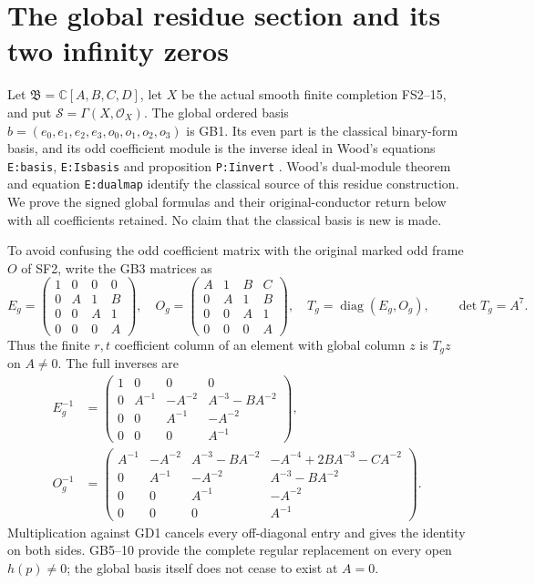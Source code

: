 \documentclass[11pt]{article}
\newcommand{\C}{\mathbb C}
\begin{document}
\section{The global residue section and its two infinity zeros}
Let $\mathfrak B=\C[A,B,C,D]$, let $X$ be the actual smooth
finite completion FS2--15, and put $\mathscr S=\Gamma(X,\mathcal O_X)$.
The global ordered basis $b=(e_0,e_1,e_2,e_3,o_0,o_1,o_2,o_3)$
is GB1. Its even part is the classical binary-form basis, and
its odd coefficient module is the inverse ideal in Wood's
equations \texttt{E:basis}, \texttt{E:Isbasis} and proposition
\texttt{P:Iinvert} \cite{WoodBinary}. Wood's dual-module theorem
and equation \texttt{E:dualmap} identify the classical source of
this residue construction. We prove the signed global formulas
and their original-conductor return below with all coefficients
retained. No claim that the classical basis is new is made.

To avoid confusing the odd coefficient matrix with the original
marked odd frame $O$ of SF2, write the GB3 matrices as
\begin{equation}
 E_g=\begin{pmatrix}1&0&0&0\\0&A&1&B\\0&0&A&1\\0&0&0&A\end{pmatrix},\quad
 O_g=\begin{pmatrix}A&1&B&C\\0&A&1&B\\0&0&A&1\\0&0&0&A\end{pmatrix},\quad
 T_g=\operatorname{diag}(E_g,O_g),\qquad\det T_g=A^7.
 \tag{GD1}
\end{equation}
Thus the finite $r,t$ coefficient column of an element with
global column $z$ is $T_gz$ on $A\ne0$. The full inverses are
\begin{equation}
\begin{aligned}
 E_g^{-1}&=\begin{pmatrix}1&0&0&0\\
 0&A^{-1}&-A^{-2}&A^{-3}-BA^{-2}\\
 0&0&A^{-1}&-A^{-2}\\0&0&0&A^{-1}\end{pmatrix},\\
 O_g^{-1}&=\begin{pmatrix}
 A^{-1}&-A^{-2}&A^{-3}-BA^{-2}&-A^{-4}+2BA^{-3}-CA^{-2}\\
 0&A^{-1}&-A^{-2}&A^{-3}-BA^{-2}\\
 0&0&A^{-1}&-A^{-2}\\0&0&0&A^{-1}
 \end{pmatrix}.
\end{aligned}\tag{GD2}
\end{equation}
Multiplication against GD1 cancels every off-diagonal entry
and gives the identity on both sides. GB5--10 provide the
complete regular replacement on every open $h(p)\ne0$;
the global basis itself does not cease to exist at $A=0$.
\end{document}

